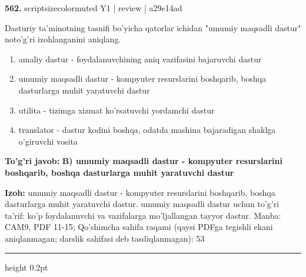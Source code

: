 \documentclass[10pt,a4paper]{article}
\begin{document}
{\bfseries\sffamily\color{ink} 562.} {scriptsizecolor{muted} Y1 | review | a29e14ad}
\par
Dasturiy ta'minotning tasnifi bo'yicha qatorlar ichidan "umumiy maqsadli dastur" noto'g'ri izohlanganini aniqlang.
\begin{enumerate}[label=\Alph*),leftmargin=9mm]
\item amaliy dastur - foydalanuvchining aniq vazifasini bajaruvchi dastur
\item umumiy maqsadli dastur - kompyuter resurslarini boshqarib, boshqa dasturlarga muhit yaratuvchi dastur
\item utilita - tizimga xizmat ko'rsatuvchi yordamchi dastur
\item translator - dastur kodini boshqa, odatda mashina bajaradigan shaklga o'giruvchi vosita
\end{enumerate}
\begin{tcolorbox}[enhanced,breakable,colback=teal!4,colframe=teal!60!black,boxrule=0.45pt,arc=1.2mm,left=2.7mm,right=2.7mm,top=1.8mm,bottom=1.8mm,before skip=2mm,after skip=2mm]
{\bfseries\sffamily\color{teal}To'g'ri javob:} \textbf{B) umumiy maqsadli dastur - kompyuter resurslarini boshqarib, boshqa dasturlarga muhit yaratuvchi dastur}
\par\smallskip
{\bfseries Izoh:} umumiy maqsadli dastur - kompyuter resurslarini boshqarib, boshqa dasturlarga muhit yaratuvchi dastur. umumiy maqsadli dastur uchun to'g'ri ta'rif: ko'p foydalanuvchi va vazifalarga mo'ljallangan tayyor dastur. Manba: CAM9, PDF 11-15; Qo'shimcha sahifa raqami (qaysi PDFga tegishli ekani aniqlanmagan; darslik sahifasi deb tasdiqlanmagan): 53
\end{tcolorbox}
\vspace{2mm}\hrule height 0.2pt\vspace{3mm}
\end{document}
